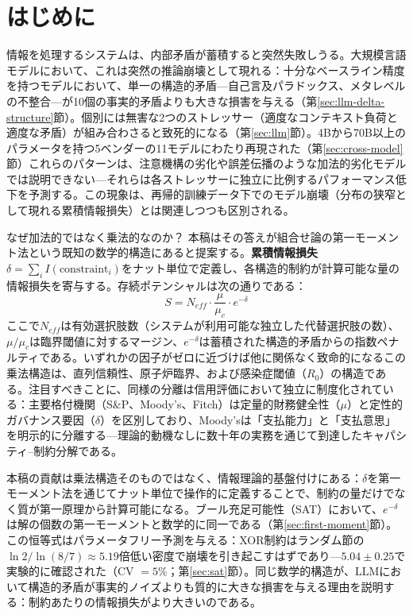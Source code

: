\documentclass[11pt,a4paper]{article}
\begin{document}
\section{はじめに}

情報を処理するシステムは、内部矛盾が蓄積すると突然失敗しうる。大規模言語モデルにおいて、これは突然の推論崩壊として現れる：十分なベースライン精度を持つモデルにおいて、単一の構造的矛盾---自己言及パラドックス、メタレベルの不整合---が10個の事実的矛盾よりも大きな損害を与える（第\ref{sec:llm-delta-structure}節）。個別には無害な2つのストレッサー（適度なコンテキスト負荷と適度な矛盾）が組み合わさると致死的になる（第\ref{sec:llm}節）。4Bから70B以上のパラメータを持つ5ベンダーの11モデルにわたり再現された（第\ref{sec:cross-model}節）これらのパターンは、注意機構の劣化や誤差伝播のような加法的劣化モデルでは説明できない---それらは各ストレッサーに独立に比例するパフォーマンス低下を予測する。この現象は、再帰的訓練データ下でのモデル崩壊\cite{shumailov2024}（分布の狭窄として現れる累積情報損失）とは関連しつつも区別される。

なぜ加法的ではなく乗法的なのか？ 本稿はその答えが組合せ論の第一モーメント法という既知の数学的構造にあると提案する。\textbf{累積情報損失}$\delta = \sum_i I(\text{constraint}_i)$をナット単位で定義し、各構造的制約が計算可能な量の情報損失を寄与する。存続ポテンシャルは次の通りである：
\begin{equation}
S = N_{eff} \cdot \frac{\mu}{\mu_c} \cdot e^{-\delta}
\label{eq:survival}
\end{equation}
ここで$N_{eff}$は有効選択肢数（システムが利用可能な独立した代替選択肢の数）、$\mu/\mu_c$は臨界閾値に対するマージン、$e^{-\delta}$は蓄積された構造的矛盾からの指数ペナルティである。いずれかの因子がゼロに近づけば他に関係なく致命的になるこの乗法構造は、直列信頼性\cite{barlow1975}、原子炉臨界\cite{duderstadt1976}、および感染症閾値（$R_0$）の構造である。注目すべきことに、同様の分離は信用評価において独立に制度化されている：主要格付機関（S\&P、Moody's、Fitch）は定量的財務健全性（$\mu$）と定性的ガバナンス要因（$\delta$）を区別しており、Moody'sは「支払能力」と「支払意思」を明示的に分離する---理論的動機なしに数十年の実務を通じて到達したキャパシティ--制約分解である\cite{cantor1996}。

本稿の貢献は乗法構造そのものではなく、情報理論的基盤付けにある：$\delta$を第一モーメント法を通じてナット単位で操作的に定義することで、制約の量だけでなく質が第一原理から計算可能になる。ブール充足可能性（SAT）において、$e^{-\delta}$は解の個数の第一モーメントと数学的に同一である（第\ref{sec:first-moment}節）。この恒等式はパラメータフリー予測を与える：XOR制約はランダム節の$\ln 2 / \ln(8/7) \approx 5.19$倍低い密度で崩壊を引き起こすはずであり---$5.04 \pm 0.25$で実験的に確認された（CV $= 5\%$；第\ref{sec:sat}節）。同じ数学的構造が、LLMにおいて構造的矛盾が事実的ノイズよりも質的に大きな損害を与える理由を説明する：制約あたりの情報損失がより大きいのである。
\end{document}
